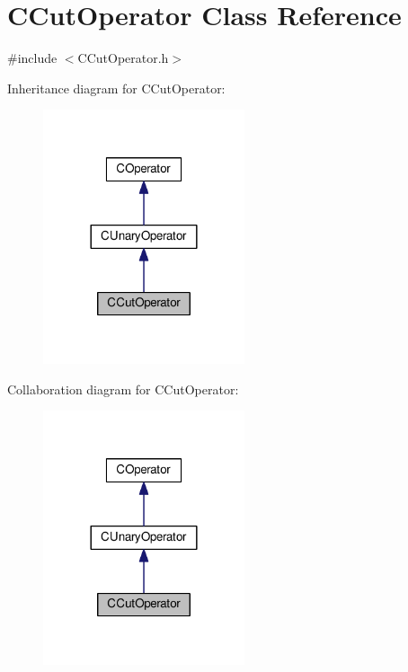 \hypertarget{classCCutOperator}{}\section{C\+Cut\+Operator Class Reference}
\label{classCCutOperator}


{\ttfamily \#include $<$C\+Cut\+Operator.\+h$>$}



Inheritance diagram for C\+Cut\+Operator\+:\nopagebreak
\begin{figure}[H]
\begin{center}
\leavevmode
\includegraphics[width=168pt]{classCCutOperator__inherit__graph}
\end{center}
\end{figure}


Collaboration diagram for C\+Cut\+Operator\+:\nopagebreak
\begin{figure}[H]
\begin{center}
\leavevmode
\includegraphics[width=168pt]{classCCutOperator__coll__graph}
\end{center}
\end{figure}
